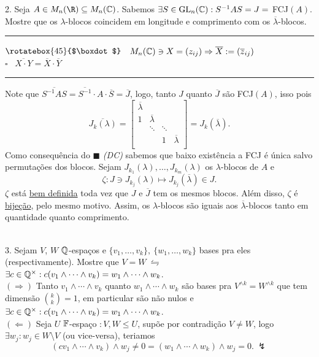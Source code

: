2. Seja \(A \in M_n(\R)\subseteq M_n(\C)\). Sabemos \(\exists S \in \operatorname{GL}_n ( \mathbb{C}): S^{-1} A S = J =\) FCJ\((A)\). Mostre que os \(\lambda\)-blocos coincidem em longitude e comprimento com os \(\overline{\lambda}\)-blocos. \\ 
    \textcolor{gris}{\hrule 
        \- \hfill \(\rotatebox{45}{$\boxdot$}\) \ \(M_n(\mathbb{C}) \ni X = (z_{ij}) \Rightarrow \overline{X} := (\overline{z}_{ij})\) \\
        \- \vspace{0.3cm}\hfill {\scriptsize $\square$} \ \(\overline{X \cdot Y} = \overline{X} \cdot \overline{Y}\) 
    \hrule
    Note que \(\overline{S^{-1} A S} = \overline{S^{-1}}\cdot A \cdot \overline{S} = \overline{J}\), logo, tanto \(J\) quanto \(\overline{J}\) são FCJ\((A)\), isso pois 
    {\small \[ \overline{J_{k}(\lambda)} = \begin{bmatrix}
        \overline{\lambda} &  & & \\ 
        1& \overline{\lambda} & &  \\ 
         & \ddots & \ddots&  \\ 
         &  &1 & \overline{\lambda} \\ 
    \end{bmatrix} = J_k(\overline{\lambda}).\]}
    \hspace{-0.1cm}Como consequência do \(\blacksquare\) \emph{(DC)} sabemos que baixo existência a FCJ é única salvo permutações dos blocos. Sejam \(J_{k_1}(\lambda), \ldots, J_{k_m}(\lambda)\) os \(\lambda\)-blocos de \(A\) e  
    \[\zeta : J \ni J_{k_j}(\lambda) \mapsto J_{k_j} (\overline{\lambda}) \in J. \]
    \(\zeta \) está \underline{bem definida} toda vez que \(J\) e \(\overline{J}\) tem os mesmos blocos. Além disso, \(\zeta \) é \underline{bijeção}, pelo mesmo motivo. Assim, os \(\lambda\)-blocos são iguais aos \(\overline{\lambda}\)-blocos tanto em quantidade quanto comprimento. 
    }\\ 
3. Sejam \(V \), \(W \) \(\mathbb{Q}\)-espaços e \(\{v_1, \ldots, v_k\}, \ \{w_1, \ldots, w_k\}\) bases pra eles (respectivamente). Mostre que \(V= W \ \leftrightharpoons \ \) \(\exists c \in \mathbb{Q}^\times : c(v_1 \wedge \cdots \wedge v_k) = w_1 \wedge \cdots \wedge w_k\).   \\
    \textcolor{gris}{
    \((\Rightarrow)\) Tanto \(v_1 \wedge \cdots \wedge v_k\) quanto \(w_1\wedge \cdots \wedge w_k\) são bases pra \(V^{\wedge k} = W^{\wedge k}\) que tem dimensão \( \binom{k}{k} = 1\), em particular são não nulos e \(\exists c\in \mathbb{Q}^\times : c(v_1 \wedge \cdots \wedge v_k)= w_1 \wedge \cdots \wedge w_k\). \\ 
    \((\Leftarrow )\) Seja \(U\) \(\mathbb{F}\)-espaço \(: V,W \leq U\), supõe por contradição \(V \neq W\), logo \(\exists w_j : w_j \in W \setminus V\) (ou vice-versa), teriamos 
    \[(cv_1 \wedge \cdots \wedge v_k )\wedge w_j \neq 0 = (w_1 \wedge \cdots \wedge w_k) \wedge w_j = 0.\ \lightning\]
    }
